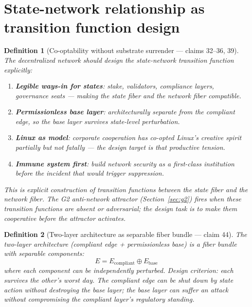 \documentclass[11pt,a4paper]{article}
\newtheorem{definition}{Definition}[section]
\begin{document}
\section{State-network relationship as transition function design}
\label{sec:design}

\begin{definition}[Co-optability without substrate surrender --- claims 32--36, 39]
\label{def:coopt}
The decentralized network should design the state-network transition
function explicitly:
\begin{enumerate}
\item \textbf{Legible ways-in for states}: stake, validators,
  compliance layers, governance seats --- making the state fiber
  and the network fiber compatible.
\item \textbf{Permissionless base layer}: architecturally separate
  from the compliant edge, so the base layer survives state-level
  perturbation.
\item \textbf{Linux as model}: corporate cooperation has co-opted
  Linux's creative spirit partially but not fatally --- the design
  target is that productive tension.
\item \textbf{Immune system first}: build network security as a
  first-class institution before the incident that would trigger
  suppression.
\end{enumerate}
This is explicit construction of transition functions between the
state fiber and the network fiber. The G2 anti-network attractor
(Section~\ref{sec:g2}) fires when these transition functions are
absent or adversarial; the design task is to make them cooperative
before the attractor activates.
\end{definition}

\begin{definition}[Two-layer architecture as separable fiber bundle --- claim 44]
\label{def:two-layer}
The two-layer architecture (compliant edge + permissionless base) is
a fiber bundle with separable components:
\[
  E = E_{\text{compliant}} \oplus E_{\text{base}}
\]
where each component can be independently perturbed. Design criterion:
each survives the other's worst day. The compliant edge can be shut
down by state action without destroying the base layer; the base layer
can suffer an attack without compromising the compliant layer's
regulatory standing.
\end{definition}

\end{document}
